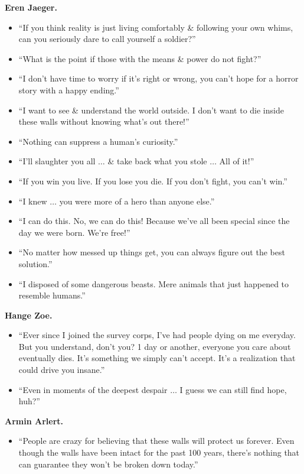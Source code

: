 \documentclass{article}
\begin{document}
\begin{enumerate}
    {\bf Eren Jaeger.}
    \begin{itemize}
    	\item ``If you think reality is just living comfortably \& following your own whims, can you seriously dare to call yourself a soldier?''
    	\item ``What is the point if those with the means \& power do not fight?''
    	\item ``I don't have time to worry if it's right or wrong, you can't hope for a horror story with a happy ending.''
    	\item ``I want to see \& understand the world outside. I don't want to die inside these walls without knowing what's out there!''
    	\item ``Nothing can suppress a human's curiosity.''
    	\item ``I'll slaughter you all $\ldots$ \& take back what you stole $\ldots$ All of it!''
    	\item ``If you win you live. If you lose you die. If you don't fight, you can't win.''
    	\item ``I knew $\ldots$ you were more of a hero than anyone else.''
    	\item ``I can do this. No, we can do this! Because we've all been special since the day we were born. We're free!''
    	\item ``No matter how messed up things get, you can always figure out the best solution.''
    	\item ``I disposed of some dangerous beasts. Mere animals that just happened to resemble humans.''
    \end{itemize}
	{\bf Hange Zoe.}
	\begin{itemize}
		\item ``Ever since I joined the survey corps, I've had people dying on me everyday. But you understand, don't you? 1 day or another, everyone you care about eventually dies. It's something we simply can't accept. It's a realization that could drive you insane.''
		\item ``Even in moments of the deepest despair $\ldots$ I guess we can still find hope, huh?''
	\end{itemize}
	{\bf Armin Arlert.}
	\begin{itemize}
		\item ``People are crazy for believing that these walls will protect us forever. Even though the walls have been intact for the past 100 years, there's nothing that can guarantee they won't be broken down today.''

\end{itemize}
\end{enumerate}
\end{document}
